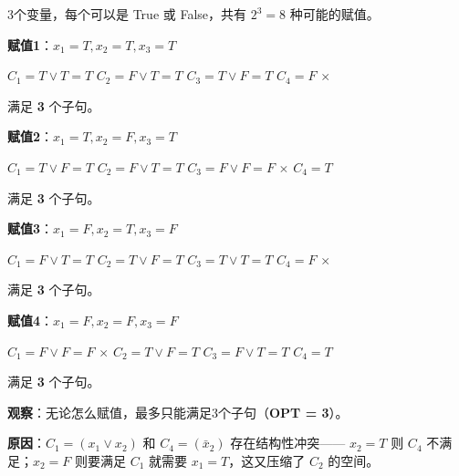 \documentclass[12pt, a4paper]{ctexart}
\begin{document}
\begin{blackboard}[枚举所有可能的赋值]

3个变量，每个可以是 True 或 False，共有 $2^3 = 8$ 种可能的赋值。

\textbf{赋值1}：$x_1 = T, x_2 = T, x_3 = T$

$C_1 = T \vee T = T$ \checkmark \quad
$C_2 = F \vee T = T$ \checkmark \quad
$C_3 = T \vee F = T$ \checkmark \quad
$C_4 = F$ $\times$

满足 \textbf{3} 个子句。

\textbf{赋值2}：$x_1 = T, x_2 = F, x_3 = T$

$C_1 = T \vee F = T$ \checkmark \quad
$C_2 = F \vee T = T$ \checkmark \quad
$C_3 = F \vee F = F$ $\times$ \quad
$C_4 = T$ \checkmark

满足 \textbf{3} 个子句。

\textbf{赋值3}：$x_1 = F, x_2 = T, x_3 = F$

$C_1 = F \vee T = T$ \checkmark \quad
$C_2 = T \vee F = T$ \checkmark \quad
$C_3 = T \vee T = T$ \checkmark \quad
$C_4 = F$ $\times$

满足 \textbf{3} 个子句。

\textbf{赋值4}：$x_1 = F, x_2 = F, x_3 = F$

$C_1 = F \vee F = F$ $\times$ \quad
$C_2 = T \vee F = T$ \checkmark \quad
$C_3 = F \vee T = T$ \checkmark \quad
$C_4 = T$ \checkmark

满足 \textbf{3} 个子句。

\textbf{观察}：无论怎么赋值，最多只能满足3个子句（\textbf{OPT = 3}）。

\textbf{原因}：$C_1 = (x_1 \vee x_2)$ 和 $C_4 = (\bar{x}_2)$ 存在结构性冲突——
$x_2 = T$ 则 $C_4$ 不满足；$x_2 = F$ 则要满足 $C_1$ 就需要 $x_1 = T$，这又压缩了 $C_2$ 的空间。

\end{blackboard}
\end{document}
